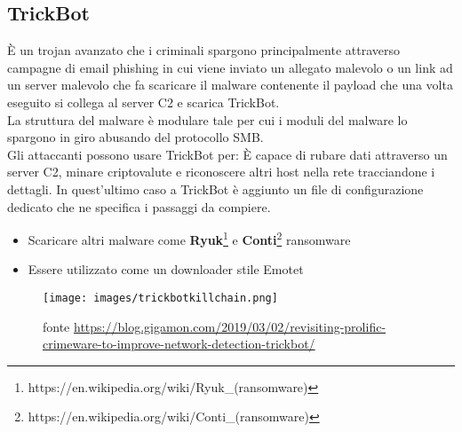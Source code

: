 \subsection{TrickBot}
\label{subsec:trickbot}
È un trojan avanzato che i criminali spargono principalmente attraverso campagne di email phishing in cui viene inviato un allegato malevolo o un link ad un server malevolo che fa scaricare il malware contenente il payload che una volta eseguito si collega al server \acrshort{C2} e scarica TrickBot.\\
La struttura del malware è modulare tale per cui i moduli del malware lo spargono in giro abusando del protocollo \acrfull{SMB}.\\
Gli attaccanti possono usare TrickBot per:
È capace di rubare dati attraverso un server \acrshort{C2}, minare criptovalute e riconoscere altri host nella rete tracciandone i dettagli.
In quest'ultimo caso a TrickBot è aggiunto un file di configurazione dedicato che ne specifica i passaggi da compiere.
\begin{itemize}[noitemsep]
    \item Scaricare altri malware come \textbf{Ryuk}\footnote{https://en.wikipedia.org/wiki/Ryuk\_(ransomware)} e \textbf{Conti}\footnote{https://en.wikipedia.org/wiki/Conti\_(ransomware)} ransomware
    \item Essere utilizzato come un downloader stile Emotet
\end{itemize}
\begin{figure}[!htp]
    \centering
    \texttt{[image: images/trickbotkillchain.png]}
    \caption{fonte \url{https://blog.gigamon.com/2019/03/02/revisiting-prolific-crimeware-to-improve-network-detection-trickbot/}}
    \label{fig:trickbotkillchain}
\end{figure}

